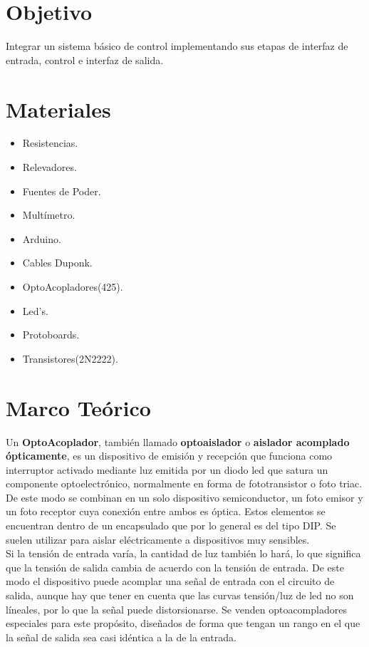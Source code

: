 \documentclass[10pt,a4paper]{article}
\begin{document}
\newpage

\section{Objetivo}

\begin{flushleft}
Integrar un sistema básico de control implementando sus etapas de interfaz de entrada, control e interfaz de salida.

\section{Materiales}

\begin{itemize}

\item Resistencias.
\item Relevadores.
\item Fuentes de Poder.
\item Multímetro.
\item Arduino.
\item Cables Duponk.
\item OptoAcopladores(425).
\item Led's.
\item Protoboards.
\item Transistores(2N2222).

\end{itemize}
\end{flushleft}
\section{Marco Teórico}

Un \textbf{OptoAcoplador}, también llamado \textbf{optoaislador} o \textbf{aislador acomplado ópticamente}, es un dispositivo de emisión y recepción que funciona como interruptor activado mediante luz emitida por un diodo led que satura un componente optoelectrónico, normalmente en forma de fototransistor o foto triac. De este modo se combinan en un solo dispositivo semiconductor, un foto emisor y un foto receptor cuya conexión entre ambos es óptica. Estos elementos se encuentran dentro de un encapsulado que por lo general es del tipo DIP. Se suelen utilizar para aislar eléctricamente a dispositivos muy sensibles.\\


Si la tensión de entrada varía, la cantidad de luz también lo hará, lo que significa que la tensión de salida cambia de acuerdo con la tensión de entrada. De este modo el dispositivo puede acomplar una señal de entrada con el circuito de salida, aunque hay que tener en cuenta que las curvas tensión/luz de led no son líneales, por lo que la señal puede distorsionarse. Se venden optoacompladores especiales para este propósito, diseñados de forma que tengan un rango en el que la señal de salida sea casi idéntica a la de la entrada.
\\
\end{document}
